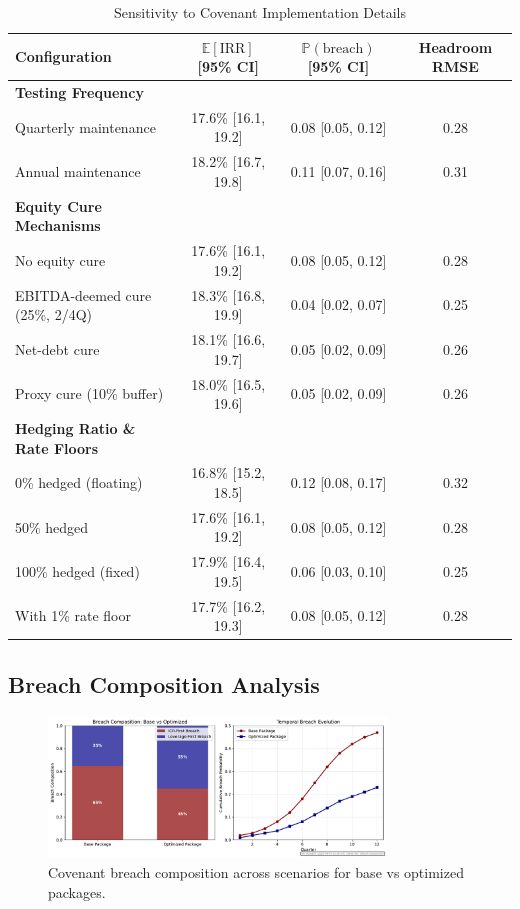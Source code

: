 \documentclass[11pt,a4paper]{article}
\newcommand{\E}{\mathbb{E}}
\newcommand{\Prob}{\mathbb{P}}
\theoremstyle{plain}
\theoremstyle{definition}
\begin{document}
\begin{table}[H]
\centering
\caption{Sensitivity to Covenant Implementation Details}
\label{tab:sensitivity}
\begin{tabular}{lccc}
\toprule
Configuration & $\E[\mathrm{IRR}]$ [95\% CI] & $\Prob(\text{breach})$ [95\% CI] & Headroom RMSE \\
\midrule
\textbf{Testing Frequency} & & & \\
Quarterly maintenance & 17.6\% [16.1, 19.2] & 0.08 [0.05, 0.12] & 0.28 \\
Annual maintenance & 18.2\% [16.7, 19.8] & 0.11 [0.07, 0.16] & 0.31 \\
\textbf{Equity Cure Mechanisms} & & & \\
No equity cure & 17.6\% [16.1, 19.2] & 0.08 [0.05, 0.12] & 0.28 \\
EBITDA-deemed cure (25\%, 2/4Q) & 18.3\% [16.8, 19.9] & 0.04 [0.02, 0.07] & 0.25 \\
Net-debt cure & 18.1\% [16.6, 19.7] & 0.05 [0.02, 0.09] & 0.26 \\
Proxy cure (10\% buffer) & 18.0\% [16.5, 19.6] & 0.05 [0.02, 0.09] & 0.26 \\
\textbf{Hedging Ratio \& Rate Floors} & & & \\
0\% hedged (floating) & 16.8\% [15.2, 18.5] & 0.12 [0.08, 0.17] & 0.32 \\
50\% hedged & 17.6\% [16.1, 19.2] & 0.08 [0.05, 0.12] & 0.28 \\
100\% hedged (fixed) & 17.9\% [16.4, 19.5] & 0.06 [0.03, 0.10] & 0.25 \\
With 1\% rate floor & 17.7\% [16.2, 19.3] & 0.08 [0.05, 0.12] & 0.28 \\
\bottomrule
\end{tabular}
\end{table}

\subsection{Breach Composition Analysis}

\begin{figure}[H]
\centering
\includegraphics[width=0.8\textwidth]{F16_breach_composition}
\caption{Covenant breach composition across scenarios for base vs optimized packages.}
\label{fig:breach_composition}
\end{figure}
\end{document}
